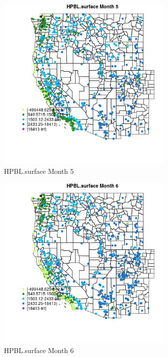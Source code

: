 \begin{figure} 
\centering  
\includegraphics[width=0.77\textwidth]{Code_Outputs/Report_ML_input_PM25_Step4_part_e_de_duplicated_aves_compiled_2019-05-21wNAs_MapObsMo5HPBLsurface.jpg} 
\caption{\label{fig:Report_ML_input_PM25_Step4_part_e_de_duplicated_aves_compiled_2019-05-21wNAsMapObsMo5HPBLsurface}HPBL.surface Month 5} 
\end{figure} 
 

\begin{figure} 
\centering  
\includegraphics[width=0.77\textwidth]{Code_Outputs/Report_ML_input_PM25_Step4_part_e_de_duplicated_aves_compiled_2019-05-21wNAs_MapObsMo6HPBLsurface.jpg} 
\caption{\label{fig:Report_ML_input_PM25_Step4_part_e_de_duplicated_aves_compiled_2019-05-21wNAsMapObsMo6HPBLsurface}HPBL.surface Month 6} 
\end{figure} 
 

